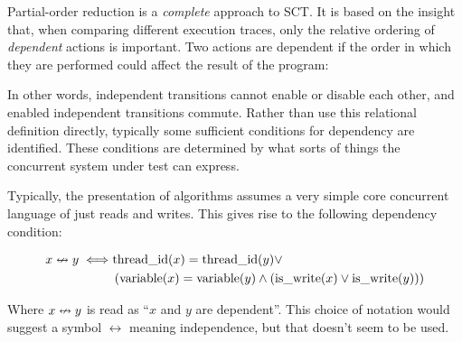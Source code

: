 Partial-order reduction is a \emph{complete} approach to SCT. It is
based on the insight that, when comparing different execution traces,
only the relative ordering of \emph{dependent} actions is
important. Two actions are dependent if the order in which they are
performed could affect the result of the program:


In other words, independent transitions cannot enable or disable each
other, and enabled independent transitions commute. Rather than use
this relational definition directly, typically some sufficient
conditions for dependency are identified. These conditions are
determined by what sorts of things the concurrent system under test
can express.

Typically, the presentation of algorithms assumes a very simple core
concurrent language of just reads and writes. This gives rise to the
following dependency condition:

\begin{align*}
  x \nleftrightarrow y \iff& \mathrm{thread\_id}(x) = \mathrm{thread\_id}(y) \lor\\
    &\left(\mathrm{variable}(x) = \mathrm{variable}(y)
     \land \left(\mathrm{is\_write}(x) \lor \mathrm{is\_write}(y)\right)\right)
\end{align*}

Where $x \nleftrightarrow y$ is read as ``$x$ and $y$ are dependent''. This
choice of notation would suggest a symbol $\leftrightarrow$ meaning
independence, but that doesn't seem to be used.

